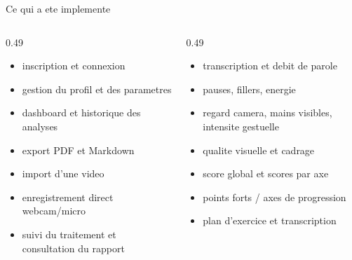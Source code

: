﻿\documentclass[10pt,aspectratio=169]{beamer}
\begin{document}
\begin{frame}{Ce qui a ete implemente}
\begin{columns}[T]
\begin{column}{0.49\textwidth}
\begin{tcolorbox}[title=Application web, colframe=primary, colback=primary!3]
\small
\begin{itemize}
    \item inscription et connexion
    \item gestion du profil et des parametres
    \item dashboard et historique des analyses
    \item export PDF et Markdown
\end{itemize}
\end{tcolorbox}
\begin{tcolorbox}[title=Studio, colframe=accent, colback=accent!3]
\small
\begin{itemize}
    \item import d'une video
    \item enregistrement direct webcam/micro
    \item suivi du traitement et consultation du rapport
\end{itemize}
\end{tcolorbox}
\end{column}
\begin{column}{0.49\textwidth}
\begin{tcolorbox}[title=Moteur analytique, colframe=success, colback=success!3]
\small
\begin{itemize}
    \item transcription et debit de parole
    \item pauses, fillers, energie
    \item regard camera, mains visibles, intensite gestuelle
    \item qualite visuelle et cadrage
\end{itemize}
\end{tcolorbox}
\begin{tcolorbox}[title=Restitution, colframe=warning!70!black, colback=warning!8]
\small
\begin{itemize}
    \item score global et scores par axe
    \item points forts / axes de progression
    \item plan d'exercice et transcription
\end{itemize}
\end{tcolorbox}
\end{column}
\end{columns}
\end{frame}
\end{document}
